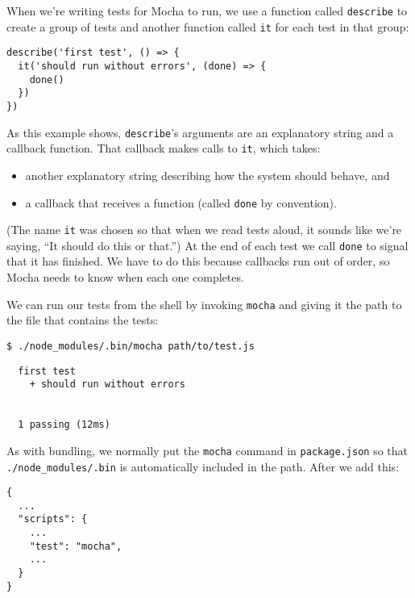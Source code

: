 When we're writing tests for Mocha to run,
we use a function called \texttt{describe} to create a group of tests
and another function called \texttt{it} for each test in that group:

\begin{verbatim}
describe('first test', () => {
  it('should run without errors', (done) => {
    done()
  })
})
\end{verbatim}

\noindent
As this example shows,
\texttt{describe}'s arguments are an explanatory string and a callback function.
That callback makes calls to \texttt{it}, which takes:

\begin{itemize}
\item
  another explanatory string describing how the system should behave, and
\item
  a callback that receives a function (called \texttt{done} by convention).
\end{itemize}

\noindent
(The name \texttt{it} was chosen so that when we read tests aloud,
it sounds like we're saying, ``It should do this or that.'')
At the end of each test we call \texttt{done} to signal that it has finished.
We have to do this because callbacks run out of order,
so Mocha needs to know when each one completes.

We can run our tests from the shell by invoking \texttt{mocha}
and giving it the path to the file that contains the tests:

\begin{verbatim}
$ ./node_modules/.bin/mocha path/to/test.js
\end{verbatim}

\begin{verbatim}
  first test
    + should run without errors


  1 passing (12ms)
\end{verbatim}


As with bundling,
we normally put the \texttt{mocha} command in \texttt{package.json}
so that \texttt{./node\_modules/.bin} is automatically included in the path.
After we add this:

\begin{verbatim}
{
  ...
  "scripts": {
    ...
    "test": "mocha",
    ...
  }
}
\end{verbatim}

